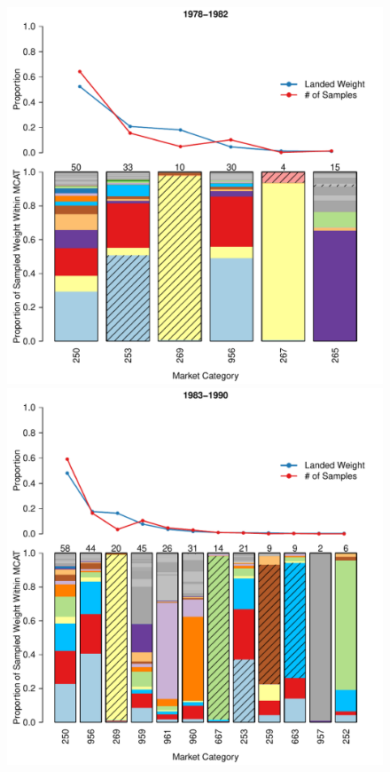 \documentclass{article}
\begin{document}
\begin{figure}
	\begin{minipage}[!ht]{0.89\textwidth}
        	\begin{center}
        	       	\begin{minipage}[!ht]{0.4\textwidth}
        	       	        \includegraphics[width=1.0\textwidth]{1978to1982Bar3.pdf}
        	       	\end{minipage}
        	       	\begin{minipage}[!ht]{0.4\textwidth}
        	       	        \includegraphics[width=1.0\textwidth]{1983to1990Bar3.pdf}
        	       	\end{minipage}
			

\end{center}
\end{minipage}
\end{figure}
\end{document}
